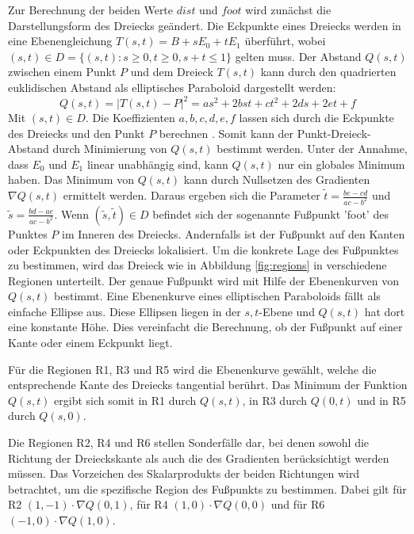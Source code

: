 \documentclass[conference]{IEEEtran}
\begin{document}
Zur Berechnung der beiden Werte $dist$ und $foot$ wird zunächst die Darstellungsform des Dreiecks geändert. Die Eckpunkte eines Dreiecks werden in eine Ebenengleichung $T(s,t) = B + sE_0 + tE_1 $ überführt, wobei $(s,t) \in D = \{(s,t): s \geq 0, t \geq 0, s + t \leq 1 \}$ gelten muss. Der Abstand $Q(s,t)$ zwischen einem Punkt $P$ und dem Dreieck $T(s,t)$ kann durch den quadrierten euklidischen Abstand als elliptisches Paraboloid dargestellt werden:
\begin{equation}
    Q(s,t) = |T(s,t) - P|^2 = as^2 + 2bst + ct^2 + 2ds + 2et + f
\end{equation}
Mit $(s,t) \in D$. Die Koeffizienten $a,b,c,d,e,f$ lassen sich durch die Eckpunkte des Dreiecks und den Punkt $P$ berechnen \autocite*{eberlyDistancePointTriangle}. Somit kann der Punkt-Dreieck-Abstand durch Minimierung von $Q(s,t)$ bestimmt werden. Unter der Annahme, dass $E_0$ und $E_1$ linear unabhängig sind, kann $Q(s,t)$ nur ein globales Minimum haben. Das Minimum von $Q(s,t)$ kann durch Nullsetzen des Gradienten $\nabla Q(s,t)$ ermittelt werden. Daraus ergeben sich die Parameter $\tilde{t} = \frac{be-cd}{ac-b^2}$ und $\tilde{s} = \frac{bd-ae}{ac-b^2}$. Wenn $(\tilde{s}, \tilde{t}) \in D$ befindet sich der sogenannte Fußpunkt 'foot' des Punktes $P$ im Inneren des Dreiecks. Andernfalls ist der Fußpunkt auf den Kanten oder Eckpunkten des Dreiecks lokalisiert. Um die konkrete Lage des Fußpunktes zu bestimmen, wird das Dreieck wie in Abbildung \ref{fig:regions} in verschiedene Regionen unterteilt. Der genaue Fußpunkt wird mit Hilfe der Ebenenkurven von $Q(s,t)$ bestimmt. Eine Ebenenkurve eines elliptischen Paraboloids fällt als einfache Ellipse aus. Diese Ellipsen liegen in der $s, t$-Ebene und $Q(s, t)$ hat dort eine konstante Höhe. Dies vereinfacht die Berechnung, ob der Fußpunkt auf einer Kante oder einem Eckpunkt liegt.

Für die Regionen R1, R3 und R5 wird die Ebenenkurve gewählt, welche die entsprechende Kante des Dreiecks tangential berührt. Das Minimum der Funktion $Q(s,t)$ ergibt sich somit in R1 durch $Q(s,t)$, in R3 durch $Q(0,t)$ und in R5 durch $Q(s,0)$.

Die Regionen R2, R4 und R6 stellen Sonderfälle dar, bei denen sowohl die Richtung der Dreieckskante als auch die des Gradienten berücksichtigt werden müssen. Das Vorzeichen des Skalarprodukts der beiden Richtungen wird betrachtet, um die spezifische Region des Fußpunkts zu bestimmen. Dabei gilt für R2 $(1,-1)\cdot \nabla Q(0,1)$, für R4 $(1,0)\cdot\nabla Q(0,0)$ und für R6 $(-1,0)\cdot\nabla Q(1,0)$. 
\end{document}
